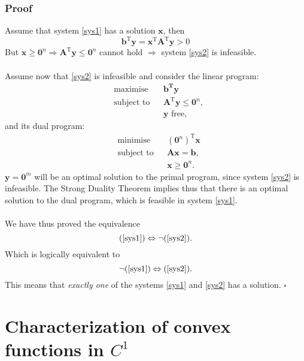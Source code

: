 \documentclass[12pt, a4paper]{article}
\begin{document}
\subsubsection*{Proof}
Assume that system \ref{sys1} has a solution $\bm{x}$, then
\begin{equation*}
\bm{b}^\text{T}\bm{y} = \bm{x}^\text{T}\bm{A}^\text{T}\bm{y} > 0
\end{equation*}
But $\bm{x}\geq \bm{0}^n \Rightarrow \bm{A}^\text{T}\bm{y}\leq\bm{0}^n$ cannot hold $\Rightarrow$ system \ref{sys2} is infeasible.
\\\\
Assume now that \ref{sys2} is infeasible and consider the linear program:
\begin{equation*}
\begin{aligned}
& \text{maximise}
& & \bm{b^\text{T}\bm{y}} \\
& \text{subject to}
& & \bm{A}^\text{T}\bm{y}\leq\bm{0}^n,\\
&&& \bm{y} \text{ free},
\end{aligned}
\end{equation*}
and its dual program:
\begin{equation*}
\begin{aligned}
& {\text{minimise}}
& & (\bm{0}^n)^\text{T}\bm{x} \\
& \text{subject to}
& & \bm{Ax=b},\\
&&& \bm{x}\geq\bm{0}^n.
\end{aligned}
\end{equation*}
\noindent $\bm{y}=\bm{0}^m$ will be an optimal solution to the primal program, since system \ref{sys2} is infeasible. The Strong Duality Theorem implies thus that there is an optimal solution to the dual program, which is feasible in system \ref{sys1}.
\\\\
We have thus proved the equivalence
\begin{equation*}
(\ref{sys1}) \Leftrightarrow \neg (\ref{sys2}).
\end{equation*}
Which is logically equivalent to
\begin{equation*}
\neg (\ref{sys1}) \Leftrightarrow (\ref{sys2}).
\end{equation*}
This means that \textit{exactly one} of the systems \ref{sys1} and \ref{sys2} has a solution. $\square$

\section{Characterization of convex functions in $C^1$}
\end{document}
